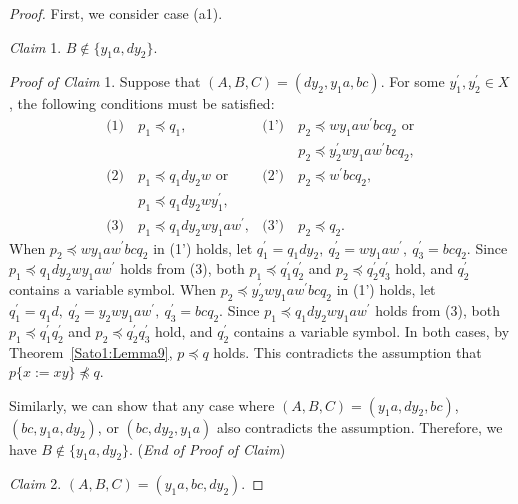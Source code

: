 \begin{proof}
  First, we consider case (a1).

  \smallskip

  \noindent
  \textit{Claim} 1. $B \not\in \{y_{1}a, dy_{2}\}$.

  \smallskip
  \noindent
  \textit{Proof of Claim} 1.
  Suppose that $(A, B, C) = (dy_{2}, y_{1}a, bc)$. For some $y_{1}^{\prime},y_{2}^{\prime}\in X$, the following conditions must be satisfied:
  \begin{align*}
    \textrm{(1)}~& p_{1} \preceq q_{1}, & \textrm{(1')}~& p_{2} \preceq wy_{1}aw^{\prime}bcq_{2}\mbox{ or} \\
    & & & p_{2} \preceq y_{2}^{\prime}wy_{1}aw^{\prime}bcq_{2},\\
    \textrm{(2)}~& p_{1} \preceq q_{1}dy_{2}w\mbox{ or}  & \textrm{(2')}~& p_{2} \preceq w^{\prime}bcq_{2},\\
    & p_{1} \preceq q_{1}dy_{2}wy_{1}^{\prime}, & & \\
    \textrm{(3)}~& p_{1} \preceq q_{1}dy_{2}wy_{1}aw^{\prime}, & \textrm{(3')}~& p_{2} \preceq q_{2}.
  \end{align*}
  When $p_{2} \preceq wy_{1}aw^{\prime}bcq_{2}$ in (1') holds, let $q^{\prime}_{1}=q_{1}dy_{2},~q^{\prime}_{2}=wy_{1}aw^{\prime},~q^{\prime}_{3}=bcq_{2}$.
  Since $p_{1} \preceq q_{1}dy_{2}wy_{1}aw^{\prime}$ holds from (3), both $p_{1} \preceq q^{\prime}_{1}q^{\prime}_{2}$ and $p_{2} \preceq q^{\prime}_{2}q^{\prime}_{3}$ hold, and $q_{2}^{\prime}$ contains a variable symbol.
  When $p_{2} \preceq y_{2}^{\prime}wy_{1}aw^{\prime}bcq_{2}$ in (1') holds, let $q^{\prime}_{1}=q_{1}d,~q^{\prime}_{2}=y_{2}wy_{1}aw^{\prime},~q^{\prime}_{3}=bcq_{2}$.
  Since $p_{1} \preceq q_{1}dy_{2}wy_{1}aw^{\prime}$ holds from (3), both $p_{1} \preceq q^{\prime}_{1}q^{\prime}_{2}$ and $p_{2} \preceq q^{\prime}_{2}q^{\prime}_{3}$ hold, and $q_{2}^{\prime}$ contains a variable symbol.
  In both cases, by Theorem~\ref{Sato1:Lemma9}, $p \preceq q$ holds.
  This contradicts the assumption that $p \{ x := xy \} \not \preceq q$.

  Similarly, we can show that any case where $(A, B, C) = (y_{1}a, dy_{2}, bc)$, $(bc, y_{1}a, dy_{2})$, or $(bc, dy_{2}, y_{1}a)$ also contradicts the assumption.
  Therefore, we have $B \not\in \{y_{1}a, dy_{2}\}$. (\textit{End of Proof of Claim})

  \smallskip

  \noindent
  \textit{Claim} 2. $(A, B, C) = (y_{1}a, bc, dy_{2})$.


\end{proof}
